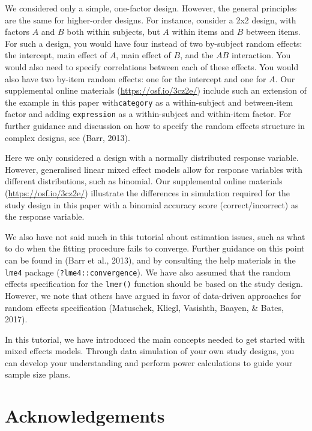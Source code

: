 \documentclass[english,doc,floatsintext]{apa6}
\begin{document}
We considered only a simple, one-factor design. However, the general principles are the same for higher-order designs. For instance, consider a 2x2 design, with factors \(A\) and \(B\) both within subjects, but \(A\) within items and \(B\) between items. For such a design, you would have four instead of two by-subject random effects: the intercept, main effect of \(A\), main effect of \(B\), and the \(AB\) interaction. You would also need to specify correlations between each of these effects. You would also have two by-item random effects: one for the intercept and one for \(A\). Our supplemental online materials (\url{https://osf.io/3cz2e/}) include such an extension of the example in this paper with\texttt{category} as a within-subject and between-item factor and adding \texttt{expression} as a within-subject and within-item factor. For further guidance and discussion on how to specify the random effects structure in complex designs, see (Barr, 2013).

Here we only considered a design with a normally distributed response variable. However, generalised linear mixed effect models allow for response variables with different distributions, such as binomial. Our supplemental online materials (\url{https://osf.io/3cz2e/}) illustrate the differences in simulation required for the study design in this paper with a binomial accuracy score (correct/incorrect) as the response variable.

We also have not said much in this tutorial about estimation issues, such as what to do when the fitting procedure fails to converge. Further guidance on this point can be found in (Barr et al., 2013), and by consulting the help materials in the \texttt{lme4} package (\texttt{?lme4::convergence}). We have also assumed that the random effects specification for the \texttt{lmer()} function should be based on the study design. However, we note that others have argued in favor of data-driven approaches for random effects specification (Matuschek, Kliegl, Vasishth, Baayen, \& Bates, 2017).

In this tutorial, we have introduced the main concepts needed to get started with mixed effects models. Through data simulation of your own study designs, you can develop your understanding and perform power calculations to guide your sample size plans.

\hypertarget{acknowledgements}{%
\section{Acknowledgements}\label{acknowledgements}}
\end{document}
